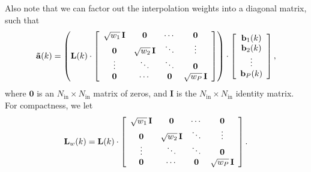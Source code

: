 Also note that we can factor out the interpolation weights into a diagonal matrix, such that
\begin{equation}
\mathbf{\tilde{a}}(k) = \left( \mathbf{L}(k) \cdot
    \left[ \begin{array}{c c c c}
    \sqrt{w_1}\, \mathbf{I} & \mathbf{0} & \cdots & \mathbf{0}\\
    \mathbf{0} & \sqrt{w_2}\, \mathbf{I} & \ddots & \vdots\\
    \vdots & \ddots & \ddots & \mathbf{0}\\
    \mathbf{0} & \cdots & \mathbf{0} & \sqrt{w_P}\, \mathbf{I}
    \end{array} \right]
 \right) \cdot
     \left[ \begin{array}{c}
    \mathbf{b}_1(k)\\
    \mathbf{b}_2(k)\\
    \vdots\\
    \mathbf{b}_P(k)
    \end{array} \right],
\end{equation}
where $\mathbf{0}$ is an $N_\textrm{in} \times N_\textrm{in}$ matrix of zeros, and $\mathbf{I}$ is the $N_\textrm{in} \times N_\textrm{in}$ identity matrix.
For compactness, we let
\begin{equation}
\mathbf{L}_w(k) = \mathbf{L}(k) \cdot
    \left[ \begin{array}{c c c c}
    \sqrt{w_1}\, \mathbf{I} & \mathbf{0} & \cdots & \mathbf{0}\\
    \mathbf{0} & \sqrt{w_2}\, \mathbf{I} & \ddots & \vdots\\
    \vdots & \ddots & \ddots & \mathbf{0}\\
    \mathbf{0} & \cdots & \mathbf{0} & \sqrt{w_P}\, \mathbf{I}
    \end{array} \right].
\end{equation}